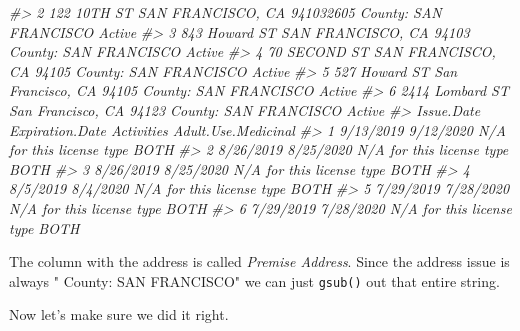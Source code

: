 \documentclass[
]{krantz}
\makeatletter
\newenvironment{Shaded}{\begin{snugshade}}{\end{snugshade}}
\newcommand{\CommentTok}[1]{\textcolor[rgb]{0.37,0.37,0.37}{\textit{#1}}}
\newcommand{\FunctionTok}[1]{\textcolor[rgb]{0,0,0}{#1}}
\newcommand{\NormalTok}[1]{#1}
\newcommand{\OtherTok}[1]{\textcolor[rgb]{0.37,0.37,0.37}{#1}}
\newcommand{\SpecialCharTok}[1]{\textcolor[rgb]{0,0,0}{#1}}
\newcommand{\StringTok}[1]{\textcolor[rgb]{0.5,0.5,0.5}{#1}}
\newenvironment{kframe}{%
\medskip{}
\setlength{\fboxsep}{.8em}
 \def\at@end@of@kframe{}%
 \ifinner\ifhmode%
  \def\at@end@of@kframe{\end{minipage}}%
  \begin{minipage}{\columnwidth}%
 \fi\fi%
 \def\FrameCommand##1{\hskip\@totalleftmargin \hskip-\fboxsep
 \colorbox{shadecolor}{##1}\hskip-\fboxsep
     \hskip-\linewidth \hskip-\@totalleftmargin \hskip\columnwidth}%
 \MakeFramed {\advance\hsize-\width
   \@totalleftmargin\z@ \linewidth\hsize
   \@setminipage}}%
 {\par\unskip\endMakeFramed%
 \at@end@of@kframe}
\renewenvironment{Shaded}{\begin{kframe}}{\end{kframe}}
\makeatother
\begin{document}
\begin{Shaded}
\begin{Highlighting}[]
\CommentTok{\#\textgreater{} 2 122 10TH ST SAN FRANCISCO, CA 941032605 County: SAN FRANCISCO Active}
\CommentTok{\#\textgreater{} 3   843 Howard ST SAN FRANCISCO, CA 94103 County: SAN FRANCISCO Active}
\CommentTok{\#\textgreater{} 4    70 SECOND ST SAN FRANCISCO, CA 94105 County: SAN FRANCISCO Active}
\CommentTok{\#\textgreater{} 5   527 Howard ST San Francisco, CA 94105 County: SAN FRANCISCO Active}
\CommentTok{\#\textgreater{} 6 2414 Lombard ST San Francisco, CA 94123 County: SAN FRANCISCO Active}
\CommentTok{\#\textgreater{}   Issue.Date Expiration.Date                Activities Adult.Use.Medicinal}
\CommentTok{\#\textgreater{} 1  9/13/2019       9/12/2020 N/A for this license type                BOTH}
\CommentTok{\#\textgreater{} 2  8/26/2019       8/25/2020 N/A for this license type                BOTH}
\CommentTok{\#\textgreater{} 3  8/26/2019       8/25/2020 N/A for this license type                BOTH}
\CommentTok{\#\textgreater{} 4   8/5/2019        8/4/2020 N/A for this license type                BOTH}
\CommentTok{\#\textgreater{} 5  7/29/2019       7/28/2020 N/A for this license type                BOTH}
\CommentTok{\#\textgreater{} 6  7/29/2019       7/28/2020 N/A for this license type                BOTH}
\end{Highlighting}
\end{Shaded}

The column with the address is called \emph{Premise Address}. Since the address issue is always " County: SAN FRANCISCO" we can just \texttt{gsub()} out that entire string.

\begin{Shaded}
\end{Shaded}

Now let's make sure we did it right.
\end{document}
